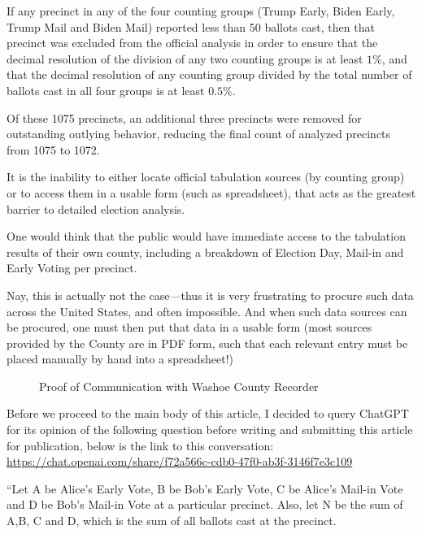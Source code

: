 If any precinct in any of the four counting groups (Trump Early, Biden Early, Trump Mail and Biden Mail) reported less than 50 ballots cast, then that precinct was excluded from the official analysis in order to ensure that the decimal resolution of the division of any two counting groups is at least $1\%$, and that the decimal resolution of any counting group divided by the total number of ballots cast in all four groups is at least $0.5\%.$

Of these 1075 precincts, an additional three precincts were removed for outstanding outlying behavior, reducing the final count of analyzed precincts from 1075 to 1072.

It is the inability to either locate official tabulation sources (by counting group) or to access them in a usable form (such as spreadsheet), that acts as the greatest barrier to detailed election analysis.

One would think that the public would have immediate access to the tabulation results of their own county, including a breakdown of Election Day, Mail-in and Early Voting per precinct. 

Nay, this is actually not the case---thus it is very frustrating to procure such data across the United States, and often impossible. And when such data sources can be procured, one must then put that data in a usable form (most sources provided by the County are in PDF form, such that each relevant entry must be placed manually by hand into a spreadsheet!)
\newpage
\begin{figure}
\caption{Proof of Communication with Washoe County Recorder}
    \centering
\end{figure}

Before we proceed to the main body of this article, I decided to query ChatGPT for its opinion of the following question before writing and submitting this article for publication, below is the link to this conversation:
\url{https://chat.openai.com/share/f72a566c-cdb0-47f0-ab3f-3146f7e3c109}

``Let A be Alice's Early Vote, B be Bob's Early Vote, C be Alice's Mail-in Vote and D be Bob's Mail-in Vote at a particular precinct. Also, let N be the sum of A,B, C and D, which is the sum of all ballots cast at the precinct.

